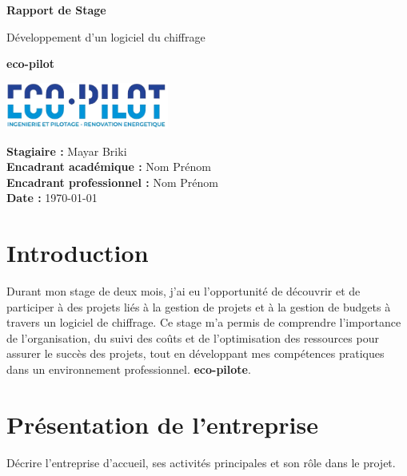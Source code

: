 \documentclass[12pt,a4paper]{report}
\begin{document}
\begin{titlepage}
    \centering
    \vspace*{2cm}
    {\Huge \textbf{Rapport de Stage} \par}
    \vspace{1.5cm}
    {\LARGE Développement d’un logiciel du chiffrage\par}
    \vspace{0.5cm}
    {\Large \textbf{eco-pilot} \par}
    \vspace{2cm}
    \includegraphics[width=0.4\textwidth]{logo.png}\par %
    \vfill
    \begin{flushright}
        \textbf{Stagiaire :} Mayar Briki \\
        \textbf{Encadrant académique :} Nom Prénom \\
        \textbf{Encadrant professionnel :} Nom Prénom \\
        \textbf{Date :} \today
    \end{flushright}
\end{titlepage}


\chapter{Introduction}
Durant mon stage de deux mois, j’ai eu l’opportunité de découvrir et de participer à des projets liés à la gestion de projets et à la gestion de budgets à travers un logiciel de chiffrage. Ce stage m’a permis de comprendre l’importance de l’organisation, du suivi des coûts et de l’optimisation des ressources pour assurer le succès des projets, tout en développant mes compétences pratiques dans un environnement professionnel. \textbf{eco-pilote}.  

\chapter{Présentation de l’entreprise}
Décrire l’entreprise d’accueil, ses activités principales et son rôle dans le projet.  
\end{document}
